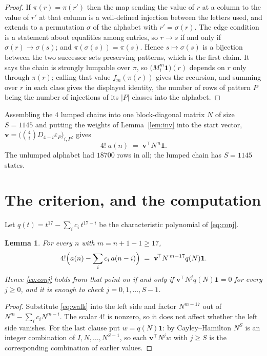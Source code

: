 \documentclass[11pt,a4paper]{article}
\theoremstyle{plain}
\newtheorem{lemma}[theorem]{Lemma}
\theoremstyle{definition}
\begin{document}
\begin{proof}
If $\pi(r)=\pi(r')$ then the map sending the value of $r$ at a column to the value of $r'$
at that column is a well-defined injection between the letters used, and extends to a
permutation $\sigma$ of the alphabet with $r'=\sigma(r)$. The edge condition is a statement
about equalities among entries, so $r\to s$ if and only if $\sigma(r)\to\sigma(s)$; and
$\pi(\sigma(s))=\pi(s)$. Hence $s\mapsto\sigma(s)$ is a bijection between the two successor
sets preserving patterns, which is the first claim. It says the chain is strongly lumpable
over $\pi$, so $\bigl(M_i^{m}\mathbf{1}\bigr)(r)$ depends on $r$ only through $\pi(r)$;
calling that value $f_m(\pi(r))$ gives the recursion, and summing over $r$ in each class
gives the displayed identity, the number of rows of pattern $P$ being the number of
injections of its $|P|$ classes into the alphabet.
\end{proof}

Assembling the $4$ lumped chains into one block-diagonal matrix $N$ of size $S=1145$ and
putting the weights of Lemma~\ref{lem:inv} into the start vector,
$\mathbf{v}=\bigl(\binom{4}{i}D_{4-i}\varepsilon_P\bigr)_{i,P}$, gives
\begin{equation}\label{eq:walk}
4!\;a(n)\;=\;\mathbf{v}^{\!\top}N^{\,n}\mathbf{1} .
\end{equation}
The unlumped alphabet had $18700$ rows in all; the lumped chain has $S=1145$ states.

\section{The criterion, and the computation}

Let $q(t)=t^{17}-\sum_i c_i\,t^{17-i}$ be the characteristic polynomial of
\eqref{eq:conj}.

\begin{lemma}\label{lem:crit}
For every $n$ with $m=n+1-1\ge17$,
\[
4!\Bigl(a(n)-\sum_i c_i\,a(n-i)\Bigr)\;=\;\mathbf{v}^{\!\top}N^{\,m-17}q(N)\mathbf{1} .
\]
Hence \eqref{eq:conj} holds from that point on if and only if
$\mathbf{v}^{\!\top}N^{j}q(N)\mathbf{1}=0$ for every $j\ge0$, and it is enough to check
$j=0,1,\dots,S-1$.
\end{lemma}

\begin{proof}
Substitute \eqref{eq:walk} into the left side and factor $N^{m-17}$ out of
$N^{m}-\sum_i c_iN^{m-i}$. The scalar $4!$ is nonzero, so it does not affect whether
the left side vanishes. For the last clause put $w=q(N)\mathbf{1}$: by Cayley--Hamilton
$N^{S}$ is an integer combination of $I,N,\dots,N^{S-1}$, so each
$\mathbf{v}^{\!\top}N^{j}w$ with $j\ge S$ is the corresponding combination of earlier
values.
\end{proof}
\end{document}
